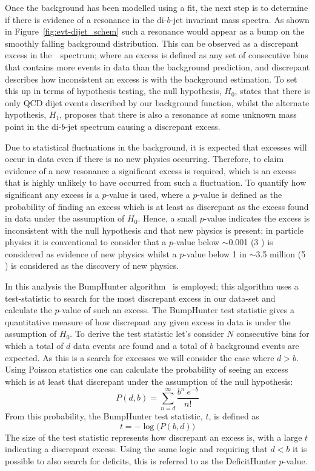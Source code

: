 Once the background has been modelled using a fit, the next step is to determine
if there is evidence of a resonance in the di-$b$-jet invariant mass spectra.
As shown in Figure~\ref{fig:evt-dijet_schem} such a resonance would appear as a bump on the smoothly falling background distribution.
This can be observed as a discrepant excess in the~\mjj~spectrum;
where an excess is defined as any set of consecutive bins that contains
more events in data than the background prediction,
and discrepant describes how inconsistent an excess is with the background estimation.
To set this up in terms of hypothesis testing, the null hypothesis, $H_0$,
states that there is only QCD dijet events described by our background function,
whilst the alternate hypothesis, $H_1$, proposes that there is also a resonance at some
unknown mass point in the di-$b$-jet spectrum causing a discrepant excess.

Due to statistical fluctuations in the background,
it is expected that excesses will occur in data even if there is no new physics occurring.
Therefore, to claim evidence of a new resonance a significant excess is required,
which is an excess that is highly unlikely to have occurred from such a fluctuation.
To quantify how significant any excess is a $p$-value is used,
where a $p$-value is defined as the probability of finding an excess which is at least as discrepant as the excess found in data
under the assumption of $H_0$.
Hence, a small $p$-value indicates the excess is inconsistent with the null hypothesis and that new physics is present;
in particle physics it is conventional to consider that a $p$-value below $\sim$0.001 (3 \sigma) is considered as evidence of new physics
whilst a $p$-value below 1 in $\sim$3.5 million (5 \sigma) is considered as the discovery of new physics.

In this analysis the {\sc BumpHunter} algorithm~\cite{dibjet-bh} is employed;
this algorithm uses a test-statistic to 
search for the most discrepant excess in our data-set
and calculate the $p$-value of such an excess.
The BumpHunter test statistic gives a quantitative measure of how discrepant any given excess in data is
under the assumption of $H_0$.
To derive the test statistic let's consider $N$ consecutive bins for which
a total of $d$ data events are found and a total of $b$ background events are expected.
As this is a search for excesses we will consider the case where $d > b$.
Using Poisson statistics one can calculate the probability of seeing an excess which is at least that discrepant
under the assumption of the null hypothesis:
\begin{equation}
  P(d,b) = \sum_{n=d}^{\infty} \frac{b^n~e^{-b}}{n!}
\end{equation}
From this probability, the BumpHunter test statistic, $t$, is defined as
\begin{equation}
 t = -\log{\big(P(b,d)\big)}
\end{equation}
The size of the test statistic represents how discrepant an excess is,
with a large $t$ indicating a discrepant excess.
Using the same logic and requiring that $d < b$ it is possible to also search for deficits,
this is referred to as the DeficitHunter $p$-value.

